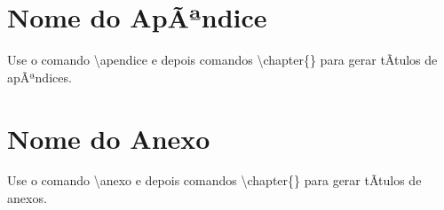 \documentclass[openright]{normas-utf-tex} %
\begin{document}
\apendice
\chapter{Nome do ApÃªndice}
\label{chap:apendice}

Use o comando {\ttfamily \textbackslash apendice} e depois comandos {\ttfamily \textbackslash chapter\{\}}
para gerar tÃ­tulos de apÃªndices.


\anexo
\chapter{Nome do Anexo}
\label{chap:anexo}

Use o comando {\ttfamily \textbackslash anexo} e depois comandos {\ttfamily \textbackslash chapter\{\}}
para gerar tÃ­tulos de anexos.


%
%
%
%



\end{document}
